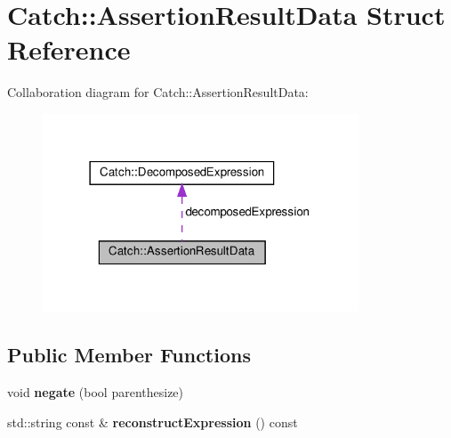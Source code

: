 \hypertarget{structCatch_1_1AssertionResultData}{}\section{Catch\+:\+:Assertion\+Result\+Data Struct Reference}
\label{structCatch_1_1AssertionResultData}


Collaboration diagram for Catch\+:\+:Assertion\+Result\+Data\+:\nopagebreak
\begin{figure}[H]
\begin{center}
\leavevmode
\includegraphics[width=266pt]{structCatch_1_1AssertionResultData__coll__graph}
\end{center}
\end{figure}
\subsection*{Public Member Functions}
\begin{DoxyCompactItemize}
\item 
\mbox{\label{structCatch_1_1AssertionResultData_a3b4df7cd1f8228ea1144b5cd0af6006a}} 
void {\bfseries negate} (bool parenthesize)
\item 
\mbox{\label{structCatch_1_1AssertionResultData_adbc0629083cd2e76c3a78696453443b0}} 
std\+::string const  \& {\bfseries reconstruct\+Expression} () const
\end{DoxyCompactItemize}
